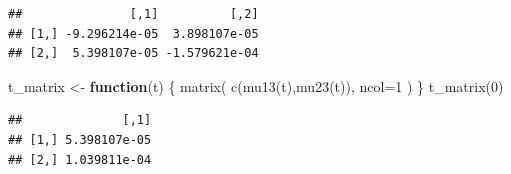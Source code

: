 \documentclass[a4paper,10pt,openany]{book}
\newenvironment{Shaded}{\begin{snugshade}}{\end{snugshade}}
\newcommand{\AttributeTok}[1]{\textcolor[rgb]{0.77,0.63,0.00}{#1}}
\newcommand{\ControlFlowTok}[1]{\textcolor[rgb]{0.13,0.29,0.53}{\textbf{#1}}}
\newcommand{\DecValTok}[1]{\textcolor[rgb]{0.00,0.00,0.81}{#1}}
\newcommand{\FunctionTok}[1]{\textcolor[rgb]{0.00,0.00,0.00}{#1}}
\newcommand{\NormalTok}[1]{#1}
\newcommand{\OtherTok}[1]{\textcolor[rgb]{0.56,0.35,0.01}{#1}}
\begin{document}
\begin{verbatim}
##               [,1]          [,2]
## [1,] -9.296214e-05  3.898107e-05
## [2,]  5.398107e-05 -1.579621e-04
\end{verbatim}

\begin{Shaded}
\begin{Highlighting}[]
\NormalTok{t\_matrix }\OtherTok{\textless{}{-}} \ControlFlowTok{function}\NormalTok{(t) \{}
  \FunctionTok{matrix}\NormalTok{(}
    \FunctionTok{c}\NormalTok{(}\FunctionTok{mu13}\NormalTok{(t),}\FunctionTok{mu23}\NormalTok{(t)),}
    \AttributeTok{ncol=}\DecValTok{1}
\NormalTok{  )}
\NormalTok{\}}
\FunctionTok{t\_matrix}\NormalTok{(}\DecValTok{0}\NormalTok{)}
\end{Highlighting}
\end{Shaded}

\begin{verbatim}
##              [,1]
## [1,] 5.398107e-05
## [2,] 1.039811e-04
\end{verbatim}
\end{document}

